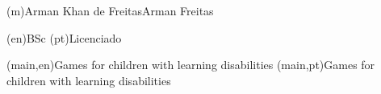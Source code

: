 
%



\ncauthorname(m){Arman Khan de Freitas}{Arman Freitas}


\ncauthordegree(en){BSc}
\ncauthordegree(pt){Licenciado}




\nctitle(main,en){Games for children with learning disabilities}%
\nctitle(main,pt){Games for children with learning disabilities}%



